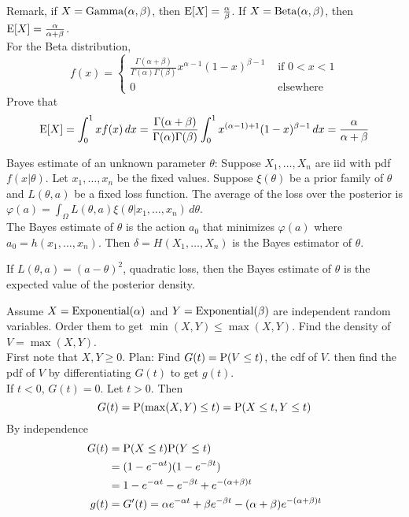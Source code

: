\documentclass[12pt]{article}
\begin{document}
 Remark, if $X = \text{Gamma}( \alpha,\beta )$, then $\mathrm{E}[ X ] = \frac{\alpha}{\beta}$. If $X = \text{Beta}( \alpha,\beta )$, then $\mathrm{E}[ X ] = \frac{\alpha}{\alpha + \beta}$. \\
 For the Beta distribution, $$f(x) = \begin{cases} \frac{\Gamma(\alpha + \beta)}{\Gamma(\alpha)\Gamma(\beta)}x^{\alpha - 1} (1-x)^{\beta- 1} &\text{ if } 0 < x < 1 \\ 0 &\text{ elsewhere} \end{cases} $$ 
 Prove that $$ \mathrm{E}[ X ] = \int_0^1 xf(x) \,dx = \frac{\Gamma(\alpha + \beta)}{\Gamma(\alpha)\Gamma(\beta)} \int_0^1 x^{(\alpha - 1) + 1} (1-x)^{\beta -1} \, dx = \frac{\alpha}{\alpha + \beta} $$ 

Bayes estimate of an unknown parameter $\theta$: Suppose $X_1,\dots, X_n$ are iid with pdf $f(x|\theta)$. Let $x_1,\dots,x_n$ be the fixed values. Suppose $\xi(\theta)$ be a prior family of $\theta$ and $L(\theta,a)$ be a fixed loss function. The average of the loss over the posterior is $\varphi(a) = \int_\Omega L(\theta,a) \xi(\theta | x_1,\dots,x_n) \, d\theta$. \\ 
The Bayes estimate of $\theta$ is the action $a_0$ that minimizes $\varphi(a)$ where $a_0 = h(x_1,\dots,x_n)$. Then $\delta = H(X_1,\dots,X_n)$ is the Bayes estimator of $\theta$. 
\begin{theorem} If $L(\theta,a) = (a-\theta)^2$, quadratic loss, then the Bayes estimate of $\theta$ is the expected value of the posterior density. \end{theorem} 
Assume $X = \text{Exponential}( \alpha )$ and $Y = \text{Exponential}( \beta )$ are independent random variables. Order them to get $\min(X,Y) \leq \max(X,Y)$. Find the density of $V = \max(X,Y)$.\\
First note that $X,Y \geq 0$. Plan: Find $G(t) = \mathrm{P}( V \leq t )$, the cdf of $V$. then find the pdf of $V$ by differentiating $G(t)$ to get $g(t)$. \\
If $t < 0$, $G(t) = 0$. Let $t > 0$. Then 
$$ G(t) = \mathrm{P}( \max(X,Y) \leq t ) = \mathrm{P}( X \leq t, Y \leq t ) $$ 
By independence $$ \begin{aligned} G(t) &= \mathrm{P}( X \leq t ) \mathrm{P}( Y \leq t ) \\ &= (1 - e^{-\alpha t})(1 - e^{-\beta t}) \\ &= 1 - e^{-\alpha t} - e^{-\beta t} + e^{-(\alpha + \beta)t} \\ g(t) &= G'(t) = \alpha e^{-\alpha t} + \beta e^{-\beta t} - (\alpha + \beta)e^{-(\alpha + \beta)t} \end{aligned} $$ 
\end{document}
